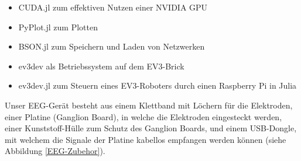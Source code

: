 \documentclass[11pt]{scrartcl}
\begin{document}
\begin{itemize}
\begin{itemize}
			\item CUDA.jl zum effektiven Nutzen einer NVIDIA GPU
				\cite{CUDA}
			
			\item PyPlot.jl zum Plotten
				\cite{pyplot}
			
			\item BSON.jl zum Speichern und Laden von Netzwerken
			
			\item ev3dev als Betriebssystem auf dem EV3-Brick \cite{ev3dev-docs}
			
			\item ev3dev.jl zum Steuern eines EV3-Roboters durch einen Raspberry Pi in Julia
				\cite{ev3dev}

			
		\end{itemize}

	\end{itemize}

	\begin{figure}[h!]
	\end{figure}

	Unser EEG-Gerät besteht aus einem Klettband mit Löchern für die Elektroden, einer Platine (Ganglion Board), in welche die Elektroden eingesteckt werden, einer Kunststoff-Hülle zum Schutz des Ganglion Boards, und einem USB-Dongle, mit welchem die Signale der Platine kabellos empfangen werden können (siehe Abbildung \ref{EEG-Zubehor}).
\end{document}
